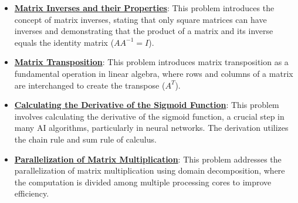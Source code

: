 \documentclass{article}%
\begin{document}
\begin{itemize}[leftmargin=*]
\item \href{https://purdue.brightspace.com/d2l/common/assets/pdfjs-d2l-dist/1.0.14-legacy/web/viewer.html?file=\%2Fcontent\%2Fenforced\%2F1095467-wl.202510.CS.24300.001\%2F04L1-Linear Algebra Primer.pdf\%3Fou\%3D1095467\&lang=en-us\&container=d2l-fileviewer-rendered-pdf\&fullscreen=d2l-fileviewer-rendered-pdf-dialog\&height=667#page=10}{\textbf{Matrix Inverses and their Properties}}: This problem introduces the concept of matrix inverses, stating that only square matrices can have inverses and demonstrating that the product of a matrix and its inverse equals the identity matrix ($AA^{-1} = I$).%
\item \href{https://purdue.brightspace.com/d2l/common/assets/pdfjs-d2l-dist/1.0.14-legacy/web/viewer.html?file=\%2Fcontent\%2Fenforced\%2F1095467-wl.202510.CS.24300.001\%2F04L1-Linear Algebra Primer.pdf\%3Fou\%3D1095467\&lang=en-us\&container=d2l-fileviewer-rendered-pdf\&fullscreen=d2l-fileviewer-rendered-pdf-dialog\&height=667#page=16}{\textbf{Matrix Transposition}}: This problem introduces matrix transposition as a fundamental operation in linear algebra, where rows and columns of a matrix are interchanged to create the transpose ($A^T$).%
\item \href{https://purdue.brightspace.com/d2l/common/assets/pdfjs-d2l-dist/1.0.14-legacy/web/viewer.html?file=\%2Fcontent\%2Fenforced\%2F1095467-wl.202510.CS.24300.001\%2F04L1-Linear Algebra Primer.pdf\%3Fou\%3D1095467\&lang=en-us\&container=d2l-fileviewer-rendered-pdf\&fullscreen=d2l-fileviewer-rendered-pdf-dialog\&height=667#page=21}{\textbf{Calculating the Derivative of the Sigmoid Function}}: This problem involves calculating the derivative of the sigmoid function, a crucial step in many AI algorithms, particularly in neural networks. The derivation utilizes the chain rule and sum rule of calculus.%
\item \href{https://purdue.brightspace.com/d2l/common/assets/pdfjs-d2l-dist/1.0.14-legacy/web/viewer.html?file=\%2Fcontent\%2Fenforced\%2F1095467-wl.202510.CS.24300.001\%2F04L1-Linear Algebra Primer.pdf\%3Fou\%3D1095467\&lang=en-us\&container=d2l-fileviewer-rendered-pdf\&fullscreen=d2l-fileviewer-rendered-pdf-dialog\&height=667#page=18}{\textbf{Parallelization of Matrix Multiplication}}: This problem addresses the parallelization of matrix multiplication using domain decomposition, where the computation is divided among multiple processing cores to improve efficiency.%
\end{itemize}%
\end{document}

